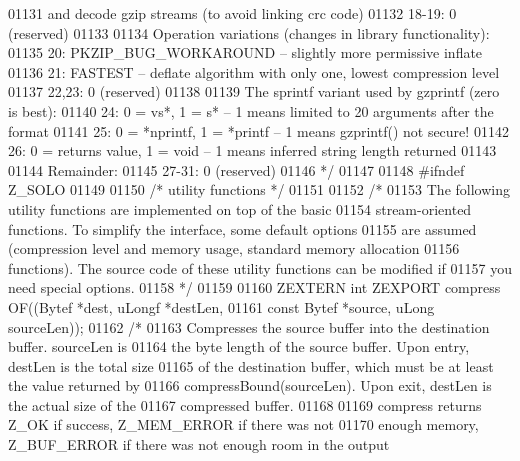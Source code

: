 \begin{DoxyCode}
01131 \textcolor{comment}{                    and decode gzip streams (to avoid linking crc code)}
01132 \textcolor{comment}{     18-19: 0 (reserved)}
01133 \textcolor{comment}{}
01134 \textcolor{comment}{    Operation variations (changes in library functionality):}
01135 \textcolor{comment}{     20: PKZIP\_BUG\_WORKAROUND -- slightly more permissive inflate}
01136 \textcolor{comment}{     21: FASTEST -- deflate algorithm with only one, lowest compression level}
01137 \textcolor{comment}{     22,23: 0 (reserved)}
01138 \textcolor{comment}{}
01139 \textcolor{comment}{    The sprintf variant used by gzprintf (zero is best):}
01140 \textcolor{comment}{     24: 0 = vs*, 1 = s* -- 1 means limited to 20 arguments after the format}
01141 \textcolor{comment}{     25: 0 = *nprintf, 1 = *printf -- 1 means gzprintf() not secure!}
01142 \textcolor{comment}{     26: 0 = returns value, 1 = void -- 1 means inferred string length returned}
01143 \textcolor{comment}{}
01144 \textcolor{comment}{    Remainder:}
01145 \textcolor{comment}{     27-31: 0 (reserved)}
01146 \textcolor{comment}{ */}
01147 
01148 \textcolor{preprocessor}{#ifndef Z\_SOLO}
01149 
01150                         \textcolor{comment}{/* utility functions */}
01151 
01152 \textcolor{comment}{/*}
01153 \textcolor{comment}{     The following utility functions are implemented on top of the basic}
01154 \textcolor{comment}{   stream-oriented functions.  To simplify the interface, some default options}
01155 \textcolor{comment}{   are assumed (compression level and memory usage, standard memory allocation}
01156 \textcolor{comment}{   functions).  The source code of these utility functions can be modified if}
01157 \textcolor{comment}{   you need special options.}
01158 \textcolor{comment}{*/}
01159 
01160 ZEXTERN \textcolor{keywordtype}{int} ZEXPORT compress OF((Bytef *dest,   uLongf *destLen,
01161                                  \textcolor{keyword}{const} Bytef *source, uLong sourceLen));
01162 \textcolor{comment}{/*}
01163 \textcolor{comment}{     Compresses the source buffer into the destination buffer.  sourceLen is}
01164 \textcolor{comment}{   the byte length of the source buffer.  Upon entry, destLen is the total size}
01165 \textcolor{comment}{   of the destination buffer, which must be at least the value returned by}
01166 \textcolor{comment}{   compressBound(sourceLen).  Upon exit, destLen is the actual size of the}
01167 \textcolor{comment}{   compressed buffer.}
01168 \textcolor{comment}{}
01169 \textcolor{comment}{     compress returns Z\_OK if success, Z\_MEM\_ERROR if there was not}
01170 \textcolor{comment}{   enough memory, Z\_BUF\_ERROR if there was not enough room in the output}

\end{DoxyCode}
